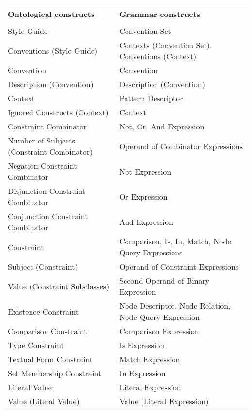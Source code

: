 \begin{table}[t]
\begin{center}
\begin{longtable}{ | p{20em} | p{20em} | } 
\hline
 &  \\
\textbf{Ontological constructs} & \textbf{Grammar constructs} \\
 &  \\
\hline
Style Guide & Convention Set \\ \hline
Conventions (Style Guide) & Contexts (Convention Set), Conventions (Context) \\ \hline
Convention & Convention \\ \hline
Description (Convention) & Description (Convention) \\ \hline
Context & Pattern Descriptor \\ \hline
Ignored Constructs (Context) &  Context \\ \hline

Constraint Combinator & Not, Or, And Expression \\ \hline
Number of Subjects (Constraint Combinator) & Operand of Combinator Expressions \\ \hline
Negation Constraint Combinator & Not Expression \\ \hline
Disjunction Constraint Combinator & Or Expression \\ \hline
Conjunction Constraint Combinator & And Expression \\ \hline

Constraint & Comparison, Is, In, Match, Node Query Expressions \\ \hline
Subject (Constraint) & Operand of Constraint Expressions \\ \hline
Value (Constraint Subclasses) & Second Operand of Binary Expression \\ \hline
Existence Constraint & Node Descriptor, Node Relation, Node Query Expression \\ \hline
Comparison Constraint & Comparison Expression \\ \hline
Type Constraint & Is Expression \\ \hline
Textual Form Constraint & Match Expression \\ \hline
Set Membership Constraint & In Expression \\ \hline
Literal Value & Literal Expression \\ \hline
Value (Literal Value) & Value (Literal Expression) \\ \hline


\end{longtable}
\end{center}
\end{table}
